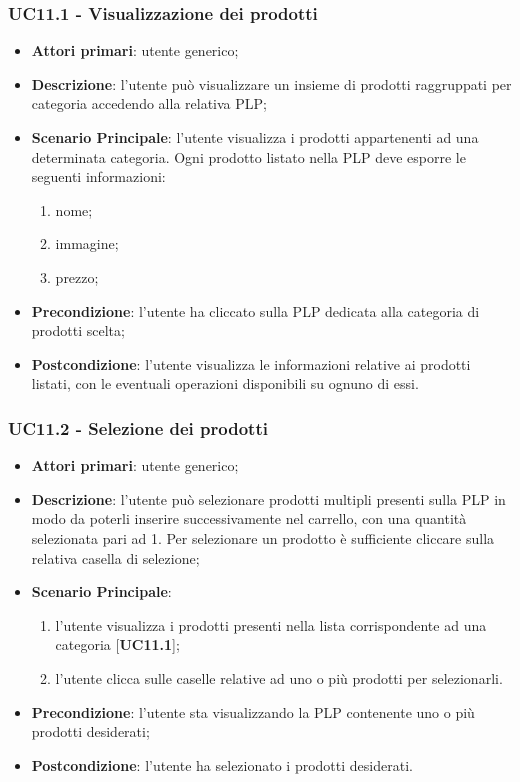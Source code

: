 \subsubsection{UC11.1 - Visualizzazione dei prodotti}
\begin{itemize}
\item \textbf{Attori primari}: utente generico;
\item \textbf{Descrizione}: l'utente può visualizzare un insieme di prodotti raggruppati per categoria accedendo alla relativa PLP;
\item \textbf{Scenario Principale}: l'utente visualizza i prodotti appartenenti ad una determinata categoria. Ogni prodotto listato nella PLP deve esporre le seguenti informazioni:
\begin{enumerate}
\item nome;
\item immagine;
\item prezzo;
\end{enumerate}
\item \textbf{Precondizione}: l'utente ha cliccato sulla PLP dedicata alla categoria di prodotti scelta;
\item \textbf{Postcondizione}: l'utente visualizza le informazioni relative ai prodotti listati, con le eventuali operazioni disponibili su ognuno di essi.
\end{itemize}
\subsubsection{UC11.2 - Selezione dei prodotti}
\begin{itemize}
\item \textbf{Attori primari}: utente generico;
\item \textbf{Descrizione}: l'utente può selezionare prodotti multipli presenti sulla PLP in modo da poterli inserire successivamente nel carrello, con una quantità selezionata pari ad 1. Per selezionare un prodotto è sufficiente cliccare sulla relativa casella di selezione;
\item \textbf{Scenario Principale}:
\begin{enumerate}
\item l'utente visualizza i prodotti presenti nella lista corrispondente ad una categoria [\textbf{UC11.1}];
\item l'utente clicca sulle caselle relative ad uno o più prodotti per selezionarli.
\end{enumerate}
\item \textbf{Precondizione}: l'utente sta visualizzando la PLP contenente uno o più prodotti desiderati;
\item \textbf{Postcondizione}: l'utente ha selezionato i prodotti desiderati.
\end{itemize}
